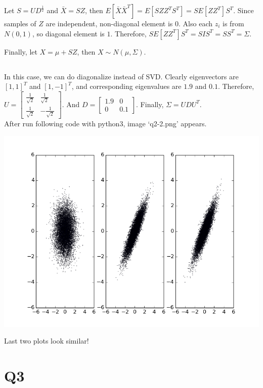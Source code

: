 \documentclass{article}
\begin{document}
Let $S=UD^{\frac{1}{2}}$ and $\bar{X}=SZ$, then
$E[\bar{X}\bar{X}^T]
= E[SZZ^TS^T]
= SE[ZZ^T]S^T$.
Since samples of $Z$ are independent, non-diagonal element is $0$.
Also each $z_i$ is from $N(0,1)$, so diagonal element is $1$.
Therefore, $SE[ZZ^T]S^T = SIS^T = SS^T = \Sigma$.

Finally, let $X = \mu + SZ$, then $X \sim N(\mu, \Sigma)$.

\subsection{}
In this case, we can do diagonalize instead of SVD.
Clearly eigenvectors are $[1,1]^T$ and $[1,-1]^T$,
and corresponding eigenvalues are $1.9$ and $0.1$.
Therefore,
$U =
\begin{bmatrix}
    \frac{1}{\sqrt{2}} & \frac{1}{\sqrt{2}} \\
    \frac{1}{\sqrt{2}} & -\frac{1}{\sqrt{2}}
\end{bmatrix}$.
And
$D =
\begin{bmatrix}
    1.9 & 0 \\
    0 & 0.1
\end{bmatrix}$.
Finally, $\Sigma = UDU^T$. \\

After run following code with python3, image `q2-2.png' appears.



\begin{center}
    \includegraphics[totalheight=0.5\textheight]{./q2-2.png}
\end{center}

Last two plots look similar!

\section{Q3}
\end{document}
